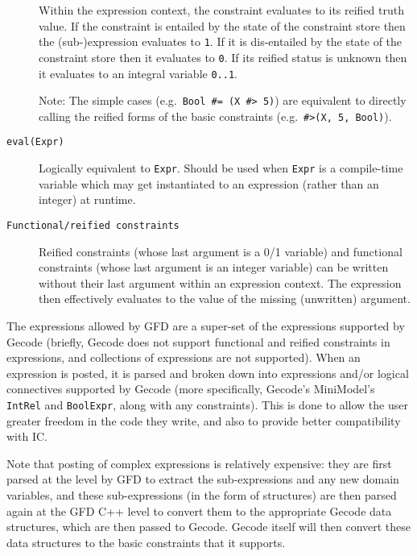\begin{description}
    Within the expression context, the constraint evaluates to its
    reified truth value.  If the constraint is entailed by the
    state of the constraint store then the (sub-)expression
    evaluates to \verb|1|.  If it is dis-entailed by the state of
    the constraint store then it evaluates to \verb|0|. If its
    reified status is unknown then it evaluates to an integral
    variable \verb|0..1|.

    Note: The simple cases (e.g.\ \verb|Bool #= (X #> 5)|) are
    equivalent to directly calling the reified forms of the basic
    constraints (e.g.\ \verb|#>(X, 5, Bool)|).

\item[\texttt{eval(Expr)}]
            Logically equivalent to \verb'Expr'.
            Should be used when \verb'Expr' is a compile-time variable
            which may get instantiated to an expression (rather than an
            integer) at runtime.

\item[\texttt{Functional/reified constraints}]
            Reified constraints (whose last argument is a 0/1 variable)
            and functional constraints (whose last argument is an integer
            variable) can be written without their last argument within
            an expression context.  The expression then effectively
            evaluates to the value of the missing (unwritten) argument.

\end{description}
 
The expressions allowed by GFD are a super-set of the expressions supported by 
Gecode (briefly, Gecode does not support functional and 
reified constraints in expressions, and collections of expressions are not 
supported). When an expression is posted, it is parsed and broken down into 
expressions and/or logical connectives supported by Gecode (more 
specifically, Gecode's MiniModel's {\tt IntRel} and {\tt BoolExpr}, along 
with any constraints). This is done to 
allow the user greater freedom in the code they write, and also to provide 
better compatibility with IC. 

Note that posting of complex expressions is relatively expensive: they are 
first parsed at the {\eclipse} level by GFD to extract the sub-expressions and 
any new domain variables, and these sub-expressions (in the form of 
{\eclipse} structures) are then parsed again at the GFD C++ level to convert
them to the appropriate Gecode data structures, which are then passed to
Gecode. Gecode itself will then convert these data structures
to the basic constraints that it supports. 


